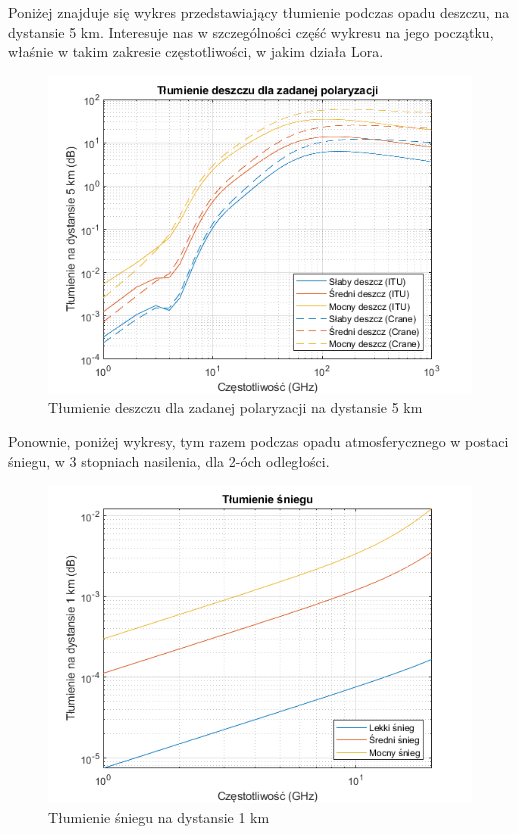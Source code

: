 Poniżej znajduje się wykres przedstawiający tłumienie podczas opadu deszczu, na dystansie 5 km. Interesuje nas w szczególności część wykresu na jego początku, właśnie w takim zakresie częstotliwości, w jakim działa Lora.
\begin{figure}[h]
	\label{fig2}
	\includegraphics{./grafika/num_sim2_tlumienie_podczas_opadu_deszczu.png}
	\caption{Tłumienie deszczu dla zadanej polaryzacji na dystansie 5 km}
\end{figure}

Ponownie, poniżej wykresy, tym razem podczas opadu atmosferycznego w postaci śniegu, w 3 stopniach nasilenia, dla 2-óch odległości.
\begin{figure}[h]
	\label{fig3}
	\includegraphics{./grafika/num_sim3_tlumienie_podczas_opadu_sniegu_1km.png}
	\caption{Tłumienie śniegu na dystansie 1 km}
\end{figure}

